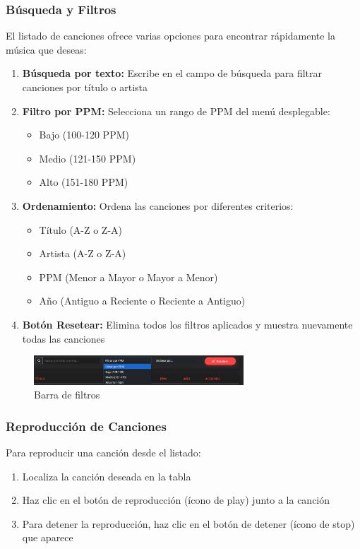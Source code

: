 \documentclass[a4paper,12pt]{article}
\begin{document}
\subsubsection{Búsqueda y Filtros}
El listado de canciones ofrece varias opciones para encontrar rápidamente la música que deseas:

\begin{enumerate}
    \item \textbf{Búsqueda por texto:} Escribe en el campo de búsqueda para filtrar canciones por título o artista
    \item \textbf{Filtro por PPM:} Selecciona un rango de PPM del menú desplegable:
    \begin{itemize}
        \item Bajo (100-120 PPM)
        \item Medio (121-150 PPM)
        \item Alto (151-180 PPM)
    \end{itemize}
    \item \textbf{Ordenamiento:} Ordena las canciones por diferentes criterios:
    \begin{itemize}
        \item Título (A-Z o Z-A)
        \item Artista (A-Z o Z-A)
        \item PPM (Menor a Mayor o Mayor a Menor)
        \item Año (Antiguo a Reciente o Reciente a Antiguo)
    \end{itemize}
    \item \textbf{Botón Resetear:} Elimina todos los filtros aplicados y muestra nuevamente todas las canciones
\end{enumerate}
\begin{figure}[h]
    \centering
    \includegraphics[width=0.7\textwidth]{imagenes/barra_canciones.png}
    \caption{Barra de filtros}
\end{figure}


\subsubsection{Reproducción de Canciones}
Para reproducir una canción desde el listado:

\begin{enumerate}
    \item Localiza la canción deseada en la tabla
    \item Haz clic en el botón de reproducción (ícono de play) junto a la canción
    \item Para detener la reproducción, haz clic en el botón de detener (ícono de stop) que aparece
\end{enumerate}
\end{document}
